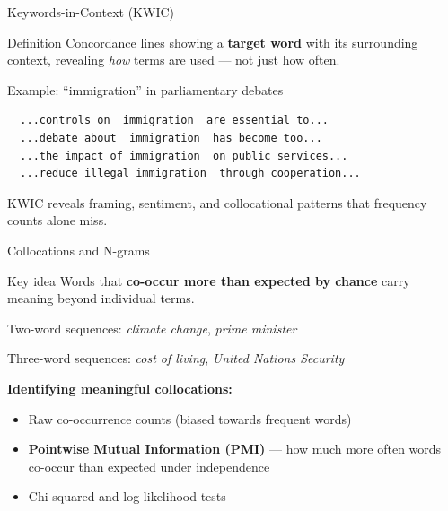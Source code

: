 \documentclass[aspectratio=169]{beamer}
\begin{document}
\begin{frame}[fragile]{Keywords-in-Context (KWIC)}
    \begin{block}{Definition}
        Concordance lines showing a \textbf{target word} with its surrounding context, revealing \textit{how} terms are used --- not just how often.
    \end{block}

    \vspace{0.1cm}
    \begin{exampleblock}{Example: ``immigration'' in parliamentary debates}
        \footnotesize
        \begin{verbatim}
  ...controls on  immigration  are essential to...
  ...debate about  immigration  has become too...
  ...the impact of immigration  on public services...
  ...reduce illegal immigration  through cooperation...\end{verbatim}
    \end{exampleblock}

    {\small {} KWIC reveals framing, sentiment, and collocational patterns that frequency counts alone miss.}
\end{frame}

\begin{frame}{Collocations and N-grams}
    \small
    \begin{alertblock}{Key idea}
        Words that \textbf{co-occur more than expected by chance} carry meaning beyond individual terms.
    \end{alertblock}

    \vspace{-0.1cm}
    \begin{description}\setlength\itemsep{0pt}
        \item[\textbf{Bigrams}] Two-word sequences: \textit{climate change}, \textit{prime minister}
        \item[\textbf{Trigrams}] Three-word sequences: \textit{cost of living}, \textit{United Nations Security}
    \end{description}

    \vspace{-0.1cm}
    \textbf{Identifying meaningful collocations:}
    \begin{itemize}\setlength\itemsep{0pt}
        \item Raw co-occurrence counts (biased towards frequent words)
        \item \textbf{Pointwise Mutual Information (PMI)} --- how much more often words co-occur than expected under independence
        \item Chi-squared and log-likelihood tests
    \end{itemize}
\end{frame}
\end{document}
